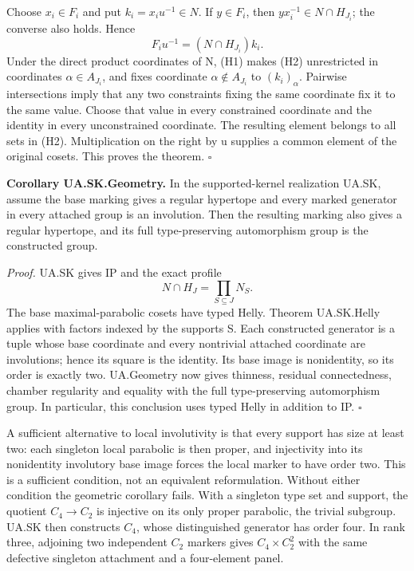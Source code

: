\documentclass[
  11pt,
  a4paper,
]{article}
\begin{document}
Choose \(x_i\in F_i\) and put \(k_i=x_i u^{-1}\in N\). If \(y\in F_i\),
then \(yx_i^{-1}\in N\cap H_{J_i}\); the converse also holds. Hence \[
 F_i u^{-1}=(N\cap H_{J_i})k_i.
 \tag{H2}
\] Under the direct product coordinates of N, (H1) makes (H2)
unrestricted in coordinates \(\alpha\in A_{J_i}\), and fixes coordinate
\(\alpha\notin A_{J_i}\) to \((k_i)_\alpha\). Pairwise intersections
imply that any two constraints fixing the same coordinate fix it to the
same value. Choose that value in every constrained coordinate and the
identity in every unconstrained coordinate. The resulting element
belongs to all sets in (H2). Multiplication on the right by u supplies a
common element of the original cosets. This proves the theorem.
\(\square\)

\textbf{Corollary UA.SK.Geometry.} In the supported-kernel realization
UA.SK, assume the base marking gives a regular hypertope and every
marked generator in every attached group is an involution. Then the
resulting marking also gives a regular hypertope, and its full
type-preserving automorphism group is the constructed group.

\emph{Proof.} UA.SK gives IP and the exact profile \[
 N\cap H_J=\prod_{S\subseteq J}N_S.
\] The base maximal-parabolic cosets have typed Helly. Theorem
UA.SK.Helly applies with factors indexed by the supports S. Each
constructed generator is a tuple whose base coordinate and every
nontrivial attached coordinate are involutions; hence its square is the
identity. Its base image is nonidentity, so its order is exactly two.
UA.Geometry now gives thinness, residual connectedness, chamber
regularity and equality with the full type-preserving automorphism
group. In particular, this conclusion uses typed Helly in addition to
IP. \(\square\)

A sufficient alternative to local involutivity is that every support has
size at least two: each singleton local parabolic is then proper, and
injectivity into its nonidentity involutory base image forces the local
marker to have order two. This is a sufficient condition, not an
equivalent reformulation. Without either condition the geometric
corollary fails. With a singleton type set and support, the quotient
\(C_4\to C_2\) is injective on its only proper parabolic, the trivial
subgroup. UA.SK then constructs \(C_4\), whose distinguished generator
has order four. In rank three, adjoining two independent \(C_2\) markers
gives \(C_4\times C_2^2\) with the same defective singleton attachment
and a four-element panel.
\end{document}
